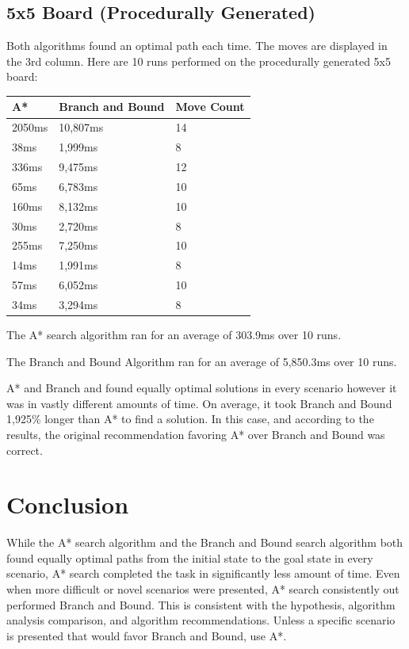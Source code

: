 \documentclass[12pt, letterpaper, final, onecolumn, titlepage] {article}
\begin{document}
\subsection{5x5 Board (Procedurally Generated)}
Both algorithms found an optimal path each time. The moves are displayed in the 3rd column.  Here are 10 runs performed on the procedurally generated 5x5 board:
\begin{center}
\begin{tabular}{|p{4cm}|p{4cm}|p{4cm}|}
\hline
\textbf{A*} & \textbf{Branch and Bound} & \textbf{Move Count} \\
\hline
2050ms & 10,807ms & 14 \\
\hline
38ms & 1,999ms & 8 \\
\hline
336ms & 9,475ms & 12 \\
\hline
65ms & 6,783ms & 10 \\
\hline
160ms & 8,132ms & 10 \\
\hline
30ms & 2,720ms & 8 \\
\hline
255ms & 7,250ms & 10 \\
\hline
14ms & 1,991ms & 8 \\
\hline
57ms & 6,052ms & 10 \\
\hline
34ms & 3,294ms & 8\\
\hline
\end{tabular}
\end{center}
\noindent The A* search algorithm ran for an average of 303.9ms over 10 runs.

\noindent The Branch and Bound Algorithm ran for an average of 5,850.3ms over 10 runs.

\noindent A* and Branch and found equally optimal solutions in every scenario however it was in vastly different amounts of time.  On average, it took Branch and Bound 1,925\% longer than A* to find a solution. In this case, and according to the results, the original recommendation favoring A* over Branch and Bound was correct.

\newpage

\section{Conclusion}
While the A* search algorithm and the Branch and Bound search algorithm both found equally optimal paths from the initial state to the goal state in every scenario, A* search completed the task in significantly less amount of time.  Even when more difficult or novel scenarios were presented, A* search consistently out performed Branch and Bound.  This is consistent with the hypothesis, algorithm analysis comparison, and algorithm recommendations.  Unless a specific scenario is presented that would favor Branch and Bound, use A*.
\end{document}
